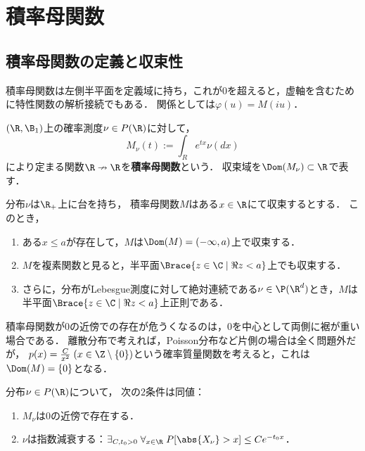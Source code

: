 \documentclass[uplatex,dvipdfmx]{jsreport}
\begin{document}
\section{積率母関数}

\subsection{積率母関数の定義と収束性}

\begin{tcolorbox}[colframe=ForestGreen, colback=ForestGreen!10!white,breakable,colbacktitle=ForestGreen!40!white,coltitle=black,fonttitle=\bfseries\sffamily,
title=]
    積率母関数は左側半平面を定義域に持ち，これが$0$を超えると，虚軸を含むために特性関数の解析接続でもある．
    関係としては$\varphi(u)=M(iu)$．
\end{tcolorbox}

\begin{definition}
    $(\R,\B_1)$上の確率測度$\nu\in P(\R)$に対して，
    \[M_\nu(t):=\int_R e^{tx}\nu(dx)\]
    により定まる関数$\R\nrightarrow\R$を\textbf{積率母関数}という．
    収束域を$\Dom(M_\nu)\subset\R$で表す．
\end{definition}

\begin{theorem}[収束域は左半平面をなす]
    分布$\nu$は$\R_+$上に台を持ち，
    積率母関数$M$はある$x\in\R$にて収束するとする．
    このとき，
    \begin{enumerate}
        \item ある$x\le a$が存在して，$M$は$\Dom(M)=(-\infty,a)$上で収束する．
        \item $M$を複素関数と見ると，半平面$\Brace{z\in\C\mid\Re z< a}$上でも収束する．
        \item さらに，分布がLebesgue測度に対して絶対連続である$\nu\in\P(\R^d)$とき，$M$は半平面$\Brace{z\in\C\mid\Re z< a}$上正則である．
    \end{enumerate}
\end{theorem}

\begin{observation}
    積率母関数が$0$の近傍での存在が危うくなるのは，$0$を中心として両側に裾が重い場合である．
    離散分布で考えれば，Poisson分布など片側の場合は全く問題外だが，
    $p(x)=\frac{C}{x^2}\;(x\in\Z\setminus\{0\})$という確率質量関数を考えると，これは$\Dom(M)=\{0\}$となる．
\end{observation}

\begin{proposition}[指数減衰するならば原点の近傍で収束する]
    分布$\nu\in P(\R)$について，
    次の2条件は同値：
    \begin{enumerate}
        \item $M_\nu$は$0$の近傍で存在する．
        \item $\nu$は指数減衰する：$\exists_{C,t_0>0}\;\forall_{x\in\R}\;P[\abs{X_\nu}>x]\le Ce^{-t_0x}$．
    \end{enumerate}
\end{proposition}
\end{document}
